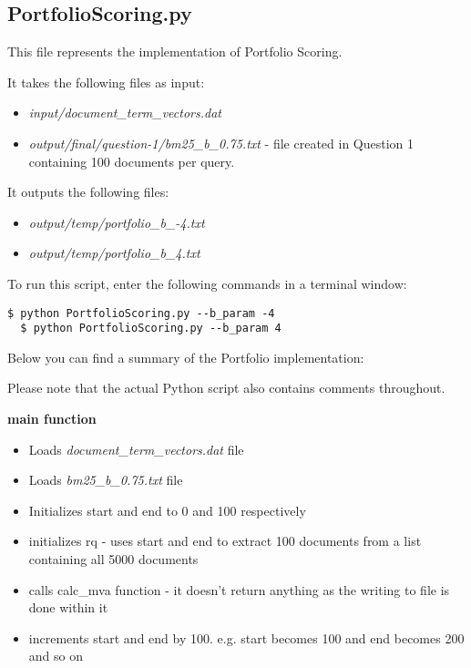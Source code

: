 \documentclass{article} %
\begin{document}
\subsection*{PortfolioScoring.py \cite{markowitz1952portfolio} \cite{wang2009portfolio} \cite{pearsoncorrelationcoefficient}}

This file represents the implementation of Portfolio Scoring.

It takes the following files as input:

\begin{itemize}
    \item \textit{input/document\_term\_vectors.dat}
    \item \textit{output/final/question-1/bm25\_b\_0.75.txt} - file created in Question 1 containing 100 documents per query.
\end{itemize}

It outputs the following files:

\begin{itemize}
    \item \textit{output/temp/portfolio\_b\_-4.txt}
    \item \textit{output/temp/portfolio\_b\_4.txt}
\end{itemize}

To run this script, enter the following commands in a terminal window:

\begin{lstlisting}[style=Bash]
  $ python PortfolioScoring.py --b_param -4
  $ python PortfolioScoring.py --b_param 4
\end{lstlisting}

Below you can find a summary of the Portfolio implementation:

Please note that the actual Python script also contains comments throughout.

\textbf{main function}

\begin{itemize}
    \item Loads \textit{document\_term\_vectors.dat} file
    \item Loads \textit{bm25\_b\_0.75.txt} file
    \item Initializes start and end to 0 and 100 respectively
    \item initializes rq - uses start and end to extract 100 documents from a list containing all 5000 documents
    \item calls calc\_mva function - it doesn't return anything as the writing to file is done within it
    \item increments start and end by 100. e.g. start becomes 100 and end becomes 200 and so on
\end{itemize}
\end{document}
